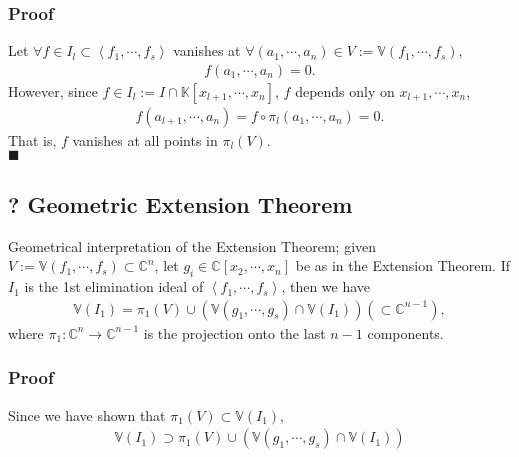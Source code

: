 \documentclass[11pt]{book}
\begin{document}
\subsubsection{Proof}
Let $\forall f \in I_l \subset \left< f_1, \cdots, f_s\right>$ vanishes at $\forall (a_1, \cdots, a_n) \in V := \mathbb{V}(f_1, \cdots, f_s)$,
\begin{eqnarray}
f(a_1, \cdots, a_n) = 0.
\end{eqnarray}
However, since $f \in I_l := I \cap \mathbb{K}[x_{l+1}, \cdots, x_n]$, $f$ depends only on $x_{l+1}, \cdots, x_n$,
\begin{eqnarray}
f(a_{l+1}, \cdots, a_n) = f\circ \pi_l(a_1, \cdots, a_n) = 0.
\end{eqnarray}
That is, $f$ vanishes at all points in $\pi_l(V)$.\\
$\blacksquare$

\subsection{? Geometric Extension Theorem}
\label{GeometricExtensionTheorem}
Geometrical interpretation of the Extension Theorem; given $V := \mathbb{V}(f_1, \cdots, f_s) \subset \mathbb{C}^n$, let $g_i \in \mathbb{C}[x_2, \cdots, x_n]$ be as in the Extension Theorem.
If $I_1$ is the 1st elimination ideal of $\left< f_1, \cdots, f_s\right>$, then we have
\begin{eqnarray}
\mathbb{V}(I_1) = \pi_1(V) \cup \left( \mathbb{V}(g_1, \cdots, g_s) \cap \mathbb{V}(I_1) \right) (\subset \mathbb{C}^{n-1}),
\end{eqnarray}
where $\pi_1: \mathbb{C}^n \to \mathbb{C}^{n-1}$ is the projection onto the last $n-1$ components.

\subsubsection{Proof}
Since we have shown that $\pi_1(V) \subset \mathbb{V}(I_1)$, 
\begin{eqnarray}
\mathbb{V}(I_1) \supset \pi_1(V) \cup \left( \mathbb{V}(g_1, \cdots, g_s) \cap \mathbb{V}(I_1) \right) 
\end{eqnarray}
\end{document}
